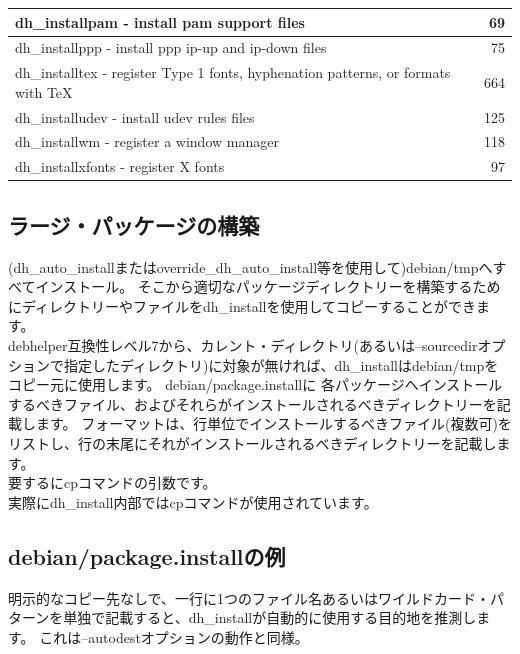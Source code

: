 \documentclass[mingoth,a4paper]{jsarticle}
\begin{document}
{\begin{table}[htb]
{\begin{tabular}{|l|r|}
dh\_installpam - install pam support files & 69 \\ \hline
dh\_installppp - install ppp ip-up and ip-down files & 75 \\ \hline
dh\_installtex - register Type 1 fonts, hyphenation patterns, or formats with TeX & 664 \\ \hline
dh\_installudev - install udev rules files & 125 \\ \hline
dh\_installwm - register a window manager & 118 \\ \hline
dh\_installxfonts - register X fonts & 97 \\ \hline
\end{tabular}
}
\end{table}
}
\subsection{ラージ・パッケージの構築}
(dh\_auto\_installまたはoverride\_dh\_auto\_install等を使用して)debian/tmpへすべてインストール。
そこから適切なパッケージディレクトリーを構築するためにディレクトリーやファイルをdh\_installを使用してコピーすることができます。
\\
debhelper互換性レベル7から、カレント・ディレクトリ(あるいは--sourcedirオプションで指定したディレクトリ)に対象が無ければ、dh\_installはdebian/tmpをコピー元に使用します。
debian/package.installに
各パッケージへインストールするべきファイル、およびそれらがインストールされるべきディレクトリーを記載します。
フォーマットは、行単位でインストールするべきファイル(複数可)をリストし、行の末尾にそれがインストールされるべきディレクトリーを記載します。\\
要するにcpコマンドの引数です。
\\
実際にdh\_install内部ではcpコマンドが使用されています。


\subsection[containsverbatim]{debian/package.installの例}


明示的なコピー先なしで、一行に1つのファイル名あるいはワイルドカード・パターンを単独で記載すると、dh\_installが自動的に使用する目的地を推測します。
これは--autodestオプションの動作と同様。
\end{document}
